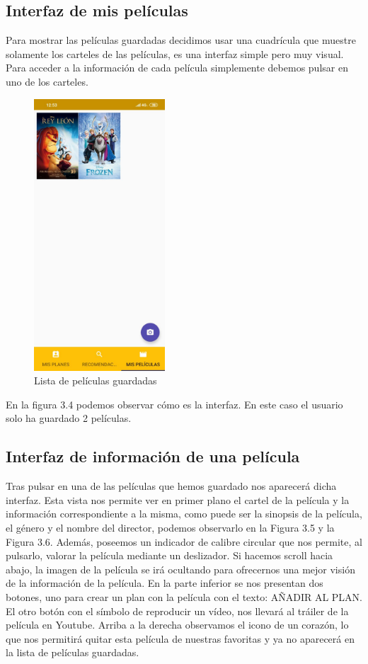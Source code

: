 \subsection{Interfaz de mis películas}
\label{makereference3.4.4}
Para mostrar las películas guardadas decidimos usar una cuadrícula que muestre solamente los carteles de las películas, es una interfaz simple pero muy visual. Para acceder a la información
de cada película simplemente debemos pulsar en uno de los carteles.
\begin{figure}[H]
    \centering
    \includegraphics[height=4in]{figures/FilmsList.jpg}
    \caption{Lista de películas guardadas}
\end{figure}
En la figura 3.4 podemos observar cómo es la interfaz. En este caso el usuario solo ha guardado 2 películas.
\subsection{Interfaz de información de una película}
\label{makereference3.4.5}

Tras pulsar en una de las películas que hemos guardado nos aparecerá dicha interfaz. 
Esta vista nos permite ver en primer plano el cartel de la película y la información correspondiente a la misma, como puede
ser la sinopsis de la película, el género y el nombre del director, podemos observarlo en la Figura 3.5 y la Figura 3.6. Además, poseemos un indicador de calibre circular que nos permite, al pulsarlo,
valorar la película mediante un deslizador.
Si hacemos scroll hacia abajo, la imagen de la película se irá ocultando para ofrecernos una mejor visión de la información de la película.
En la parte inferior se nos presentan dos botones, uno para crear un plan con la película con el texto: AÑADIR AL PLAN. El otro botón con el símbolo de reproducir un vídeo, nos llevará al tráiler de la película en Youtube.
Arriba a la derecha observamos el icono de un corazón, lo que nos permitirá quitar esta película de nuestras favoritas y ya no aparecerá en la
lista de películas guardadas.

